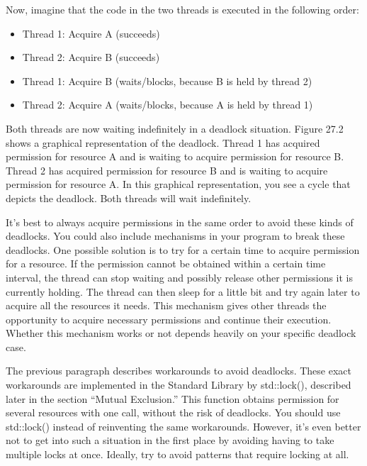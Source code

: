 Now, imagine that the code in the two threads is executed in the following order:

\begin{itemize}
\item
Thread 1: Acquire A (succeeds)

\item
Thread 2: Acquire B (succeeds)

\item
Thread 1: Acquire B (waits/blocks, because B is held by thread 2)

\item
Thread 2: Acquire A (waits/blocks, because A is held by thread 1)
\end{itemize}

Both threads are now waiting indefinitely in a deadlock situation. Figure 27.2 shows a graphical representation of the deadlock. Thread 1 has acquired permission for resource A and is waiting to acquire permission for resource B. Thread 2 has acquired permission for resource B and is waiting to acquire permission for resource A. In this graphical representation, you see a cycle that depicts the deadlock. Both threads will wait indefinitely.


It’s best to always acquire permissions in the same order to avoid these kinds of deadlocks. You could also include mechanisms in your program to break these deadlocks. One possible solution is to try for a certain time to acquire permission for a resource. If the permission cannot be obtained within a certain time interval, the thread can stop waiting and possibly release other permissions it is currently holding. The thread can then sleep for a little bit and try again later to acquire all the resources it needs. This mechanism gives other threads the opportunity to acquire necessary permissions and continue their execution. Whether this mechanism works or not depends heavily on your specific deadlock case.

The previous paragraph describes workarounds to avoid deadlocks. These exact workarounds are implemented in the Standard Library by std::lock(), described later in the section “Mutual Exclusion.” This function obtains permission for several resources with one call, without the risk of deadlocks. You should use std::lock() instead of reinventing the same workarounds. However, it’s even better not to get into such a situation in the first place by avoiding having to take multiple locks at once. Ideally, try to avoid patterns that require locking at all.

